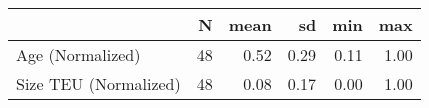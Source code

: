 
\begin{tabular}[t]{lrrrrr}
\toprule
  & N & mean & sd & min & max\\
\midrule
Age (Normalized) & 48 & 0.52 & 0.29 & 0.11 & 1.00\\
Size TEU (Normalized) & 48 & 0.08 & 0.17 & 0.00 & 1.00\\
\bottomrule
\end{tabular}
